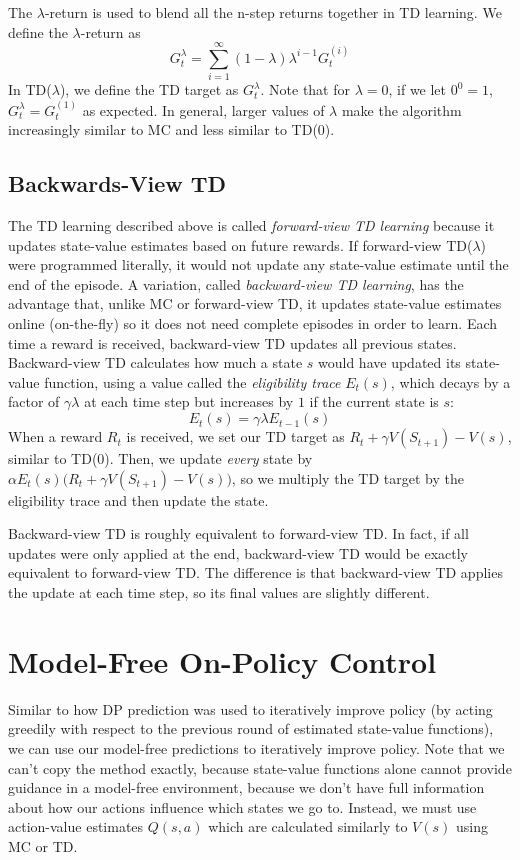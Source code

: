 \documentclass{article}
\newcommand{\ita}{\textit}
\begin{document}
The $\lambda$-return is used to blend all the n-step returns together in TD learning. We define the $\lambda$-return as
$$G^\lambda_t = \sum_{i=1}^\infty (1-\lambda)\lambda^{i-1}G^{(i)}_t$$
In TD($\lambda$), we define the TD target as $G^\lambda_t$. Note that for $\lambda = 0$, if we let $0^0 = 1$, $G^\lambda_t = G^{(1)}_t$ as expected. In general, larger values of $\lambda$ make the algorithm increasingly similar to MC and less similar to TD(0).

\subsection{Backwards-View TD}

The TD learning described above is called \ita{forward-view TD learning} because it updates state-value estimates based on future rewards. If forward-view TD($\lambda$) were programmed literally, it would not update any state-value estimate until the end of the episode. A variation, called \ita{backward-view TD learning}, has the advantage that, unlike MC or forward-view TD, it updates state-value estimates online (on-the-fly) so it does not need complete episodes in order to learn. Each time a reward is received, backward-view TD updates all previous states. Backward-view TD calculates how much a state $s$ would have updated its state-value function, using a value called the \ita{eligibility trace} $E_t(s)$, which decays by a factor of $\gamma\lambda$ at each time step but increases by $1$ if the current state is $s$:
$$E_t(s) = \gamma\lambda E_{t-1}(s)$$
When a reward $R_t$ is received, we set our TD target as $R_t + \gamma V(S_{t+1}) - V(s)$, similar to TD(0). Then, we update \ita{every} state by $\alpha E_t(s)\bigg(R_t + \gamma V(S_{t+1}) - V(s)\bigg)$, so we multiply the TD target by the eligibility trace and then update the state.

Backward-view TD is roughly equivalent to forward-view TD. In fact, if all updates were only applied at the end, backward-view TD would be exactly equivalent to forward-view TD. The difference is that backward-view TD applies the update at each time step, so its final values are slightly different.

\section{Model-Free On-Policy Control}

Similar to how DP prediction was used to iteratively improve policy (by acting greedily with respect to the previous round of estimated state-value functions), we can use our model-free predictions to iteratively improve policy. Note that we can't copy the method exactly, because state-value functions alone cannot provide guidance in a model-free environment, because we don't have full information about how our actions influence which states we go to. Instead, we must use action-value estimates $Q(s, a)$ which are calculated similarly to $V(s)$ using MC or TD.
\end{document}
